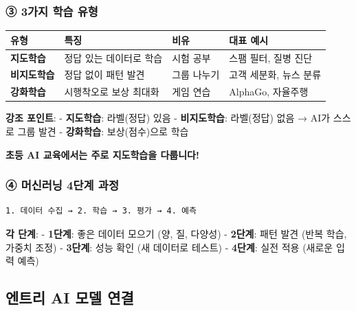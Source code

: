 \documentclass[a4paper, 11pt]{article}
\begin{document}
\hypertarget{uxac00uxc9c0-uxd559uxc2b5-uxc720uxd615}{%
\subsubsection{\textbf{③} 3가지 학습
유형}\label{uxac00uxc9c0-uxd559uxc2b5-uxc720uxd615}}

\begin{longtable}{p{2.5cm}p{3.5cm}p{4.0cm}p{4.0cm}}
\toprule\noalign{}
\textbf{유형} & \textbf{특징} & \textbf{비유} & \textbf{대표 예시} \\
\midrule\noalign{}
\endhead
\bottomrule\noalign{}
\endlastfoot
\textbf{지도학습} & 정답 있는 데이터로 학습 & 시험 공부 & 스팸 필터,
질병 진단 \\
\textbf{비지도학습} & 정답 없이 패턴 발견 & 그룹 나누기 & 고객 세분화,
뉴스 분류 \\
\textbf{강화학습} & 시행착오로 보상 최대화 & 게임 연습 & AlphaGo,
자율주행 \\
\end{longtable}

\textbf{강조 포인트}: - \textbf{지도학습}: 라벨(정답) 있음  -
\textbf{비지도학습}: 라벨(정답) 없음  → AI가 스스로 그룹 발견 -
\textbf{강화학습}: 보상(점수)으로 학습 

\textbf{ 초등 AI 교육에서는 주로 지도학습을 다룹니다!}

\hypertarget{uxba38uxc2e0uxb7ecuxb2dd-4uxb2e8uxacc4-uxacfcuxc815}{%
\subsubsection{\textbf{④} 머신러닝 4단계
과정}\label{uxba38uxc2e0uxb7ecuxb2dd-4uxb2e8uxacc4-uxacfcuxc815}}

\begin{verbatim}
1. 데이터 수집 → 2. 학습 → 3. 평가 → 4. 예측
\end{verbatim}

\textbf{각 단계}: - \textbf{1단계}: 좋은 데이터 모으기 (양, 질, 다양성)
- \textbf{2단계}: 패턴 발견 (반복 학습, 가중치 조정) - \textbf{3단계}:
성능 확인 (새 데이터로 테스트) - \textbf{4단계}: 실전 적용 (새로운 입력
예측)

\hypertarget{uxc5d4uxd2b8uxb9ac-ai-uxbaa8uxb378-uxc5f0uxacb0-1}{%
\subsection{엔트리 AI 모델
연결}\label{uxc5d4uxd2b8uxb9ac-ai-uxbaa8uxb378-uxc5f0uxacb0-1}}
\end{document}
